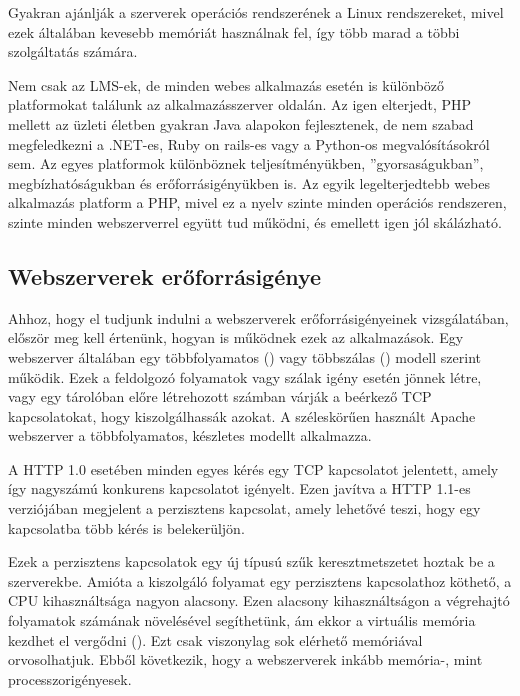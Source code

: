 Gyakran ajánlják a szerverek operációs rendszerének a Linux rendszereket, mivel ezek általában kevesebb memóriát használnak fel, így több marad a többi szolgáltatás számára. 

Nem csak az LMS-ek, de minden webes alkalmazás esetén is különböző platformokat találunk az alkalmazásszerver oldalán. Az igen elterjedt, PHP mellett az üzleti életben gyakran Java alapokon fejlesztenek, de nem szabad megfeledkezni a .NET-es, Ruby on rails-es vagy a Python-os megvalósításokról sem. Az egyes platformok különböznek teljesítményükben, ''gyorsaságukban'', megbízhatóságukban és erőforrásigényükben is. Az egyik legelterjedtebb webes alkalmazás platform a PHP, mivel ez a nyelv szinte minden operációs rendszeren, szinte minden webszerverrel együtt tud működni, és emellett igen jól skálázható.

\subsection{Webszerverek erőforrásigénye}

Ahhoz, hogy el tudjunk indulni a webszerverek erőforrásigényeinek vizsgálatában, először meg kell értenünk, hogyan is működnek ezek az alkalmazások. Egy webszerver általában egy többfolyamatos () vagy többszálas () modell szerint működik\cite{Lu:2001:FCA:882481.883781}. Ezek a feldolgozó folyamatok vagy szálak igény esetén jönnek létre, vagy egy tárolóban előre létrehozott számban várják a beérkező TCP kapcsolatokat, hogy kiszolgálhassák azokat. A széleskörűen használt Apache webszerver a többfolyamatos, készletes modellt alkalmazza.

A HTTP 1.0 esetében minden egyes kérés egy TCP kapcsolatot jelentett, amely így nagyszámú konkurens kapcsolatot igényelt. Ezen javítva a HTTP 1.1-es verziójában megjelent a perzisztens kapcsolat, amely lehetővé teszi, hogy egy kapcsolatba több kérés is belekerüljön\cite{rfc1945,rfc2616}.

Ezek a perzisztens kapcsolatok egy új típusú szűk keresztmetszetet hoztak be a szerverekbe. Amióta a kiszolgáló folyamat egy perzisztens kapcsolathoz köthető, a CPU kihasználtsága nagyon alacsony. Ezen alacsony kihasználtságon a végrehajtó folyamatok számának növelésével segíthetünk, ám ekkor a virtuális memória kezdhet el vergődni (). Ezt csak viszonylag sok elérhető memóriával orvosolhatjuk. Ebből következik, hogy a webszerverek inkább \mbox{memória-,} mint processzorigényesek. 

